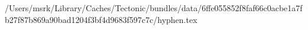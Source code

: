 /Users/msrk/Library/Caches/Tectonic/bundles/data/6ffe055852f8faf66c0acbe1a7fb27f87b869a90bad1204f3bf4d9683f597c7c/hyphen.tex